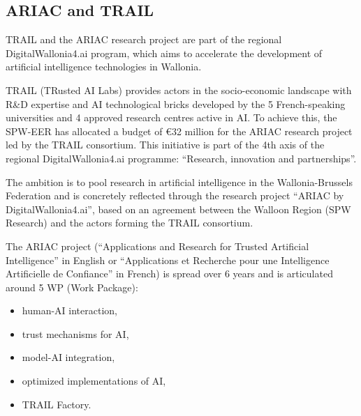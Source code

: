 
\subsection{ARIAC and TRAIL}

TRAIL and the ARIAC research project are part of the regional DigitalWallonia4.ai program, which aims to accelerate the development of artificial intelligence technologies in Wallonia.

TRAIL (TRusted AI Labs) provides actors in the socio-economic landscape with R\&D expertise and AI technological bricks developed by the 5 French-speaking universities and 4 approved research centres active in AI. To achieve this, the SPW-EER has allocated a budget of €32 million for the ARIAC research project led by the TRAIL consortium. This initiative is part of the 4th axis of the regional DigitalWallonia4.ai programme: “Research, innovation and partnerships”.

The ambition is to pool research in artificial intelligence in the Wallonia-Brussels Federation and is concretely reflected through the research project “ARIAC by DigitalWallonia4.ai”, based on an agreement between the Walloon Region (SPW Research) and the actors forming the TRAIL consortium.

The ARIAC project (“Applications and Research for Trusted Artificial Intelligence” in English or “Applications et Recherche pour une Intelligence Artificielle de Confiance” in French) is spread over 6 years and is articulated around 5 WP (Work Package):

\begin{itemize}
    \item human-AI interaction,
    \item trust mechanisms for AI,
    \item model-AI integration,
    \item optimized implementations of AI,
    \item TRAIL Factory.
\end{itemize}
